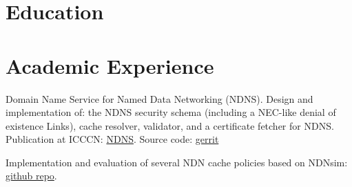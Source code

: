 \documentclass[]{deedy-resume-openfont}
\begin{document}
%
%
\lastupdated

%
%






\section{Education}
 

\section{Academic Experience}


\begin{tightemize}
\item Domain Name Service for Named Data Networking (NDNS). Design and implementation of: the NDNS security schema (including a NEC-like denial of existence Links), cache resolver, validator, and a certificate fetcher for NDNS. Publication at ICCCN: \href{https://named-data.net/publications/2017-icccn-ndns/}{NDNS}. Source code: \href{https://gerrit.named-data.net/#/q/project:ndns}{gerrit}
\item Implementation and evaluation of several NDN cache policies based on NDNsim: \href{https://github.com/ndncomm/nfd-caching-policies}{github repo}.
\end{tightemize}
\sectionsep
\end{document}

